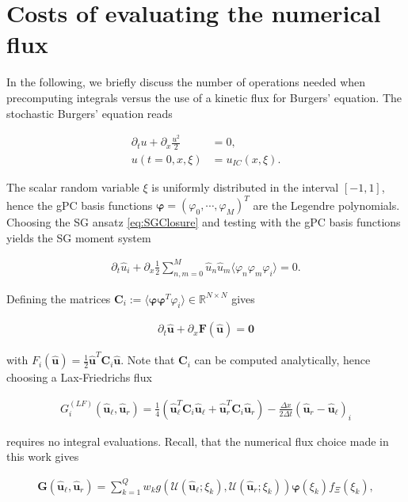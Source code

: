 \appendix
\section{Costs of evaluating the numerical flux}
\label{app:costNumFlux}
In the following, we briefly discuss the number of operations needed when precomputing integrals versus the use of a kinetic flux for Burgers' equation. The stochastic Burgers' equation reads
\begin{linenomath*}\begin{align*}
\partial_t u + \partial_x \frac{u^2}{2} &= 0,\\
u(t=0,x,\xi) &= u_{IC}(x,\xi).
\end{align*}\end{linenomath*}
The scalar random variable $\xi$ is uniformly distributed in the interval $[-1,1]$, hence the gPC basis functions $\bm\varphi=(\varphi_0,\cdots,\varphi_M)^T$ are the Legendre polynomials. Choosing the SG ansatz \eqref{eq:SGClosure} and testing with the gPC basis functions yields the SG moment system
\begin{linenomath*}\begin{align*}
\partial_t \hat u_i + \partial_x \frac12\sum_{n,m = 0}^M \hat u_n \hat u_m \langle \varphi_n\varphi_m\varphi_i \rangle = 0.
\end{align*}\end{linenomath*}
Defining the matrices $\bm C_i := \langle \bm\varphi\bm\varphi^T\varphi_i\rangle\in\mathbb{R}^{N\times N}$ gives
\begin{linenomath*}\begin{align*}
\partial_t \bm{\hat u} + \partial_x \bm F(\bm{\hat u}) = \bm 0
\end{align*}\end{linenomath*}
with $F_i(\bm{\hat u}) = \frac12\bm{\hat u}^T\bm C_i\bm{\hat u}$. Note that $\bm{C}_i$ can be computed analytically, hence choosing a Lax-Friedrichs flux
\begin{linenomath*}\begin{align}\label{eq:numFluxAnalytic}
G_i^{(LF)}(\bm{\hat u}_{\ell},\bm{\hat u}_{r}) =\frac{1}{4}\left(\bm{\hat u}_{\ell}^T \bm{C}_i \bm{\hat u}_{\ell}+\bm{\hat u}_{r}^T \bm{C}_i \bm{\hat u}_{r}\right) - \frac{\Delta x}{2\Delta t}(\bm{\hat u}_{r}-\bm{\hat u}_{\ell})_i
\end{align}\end{linenomath*}
requires no integral evaluations. Recall, that the numerical flux choice made in this work gives
\begin{linenomath*}\begin{align}\label{eq:numericalFluxIPMBurgers}
 \bm{G}(\bm{\hat u}_{\ell},\bm{\hat u}_{r}) = \sum_{k=1}^Q w_k g(\mathcal{U}(\bm{\hat u}_{\ell};\xi_k),\mathcal{U}(\bm{\hat u}_{r};\xi_k))\bm{\varphi}(\xi_k)f_{\Xi}(\xi_k),
\end{align}\end{linenomath*}
